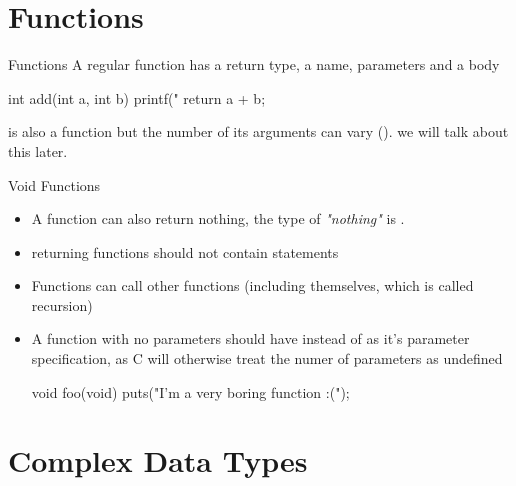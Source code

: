 \documentclass[10pt,graphics,aspectratio=169,table]{beamer}
\begin{document}
\section{Functions}
\begin{frame}[fragile]{Functions}
    A regular function has a return type, a name, parameters and a body
    \begin{codeblock}
int add(int a, int b){
    printf("%
    return a + b;
}
    \end{codeblock}

     is also a function but the number of its arguments 
    can vary (). we will talk about this later.
\end{frame}
\begin{frame}[fragile]{Void Functions}
    \begin{itemize}
       
        \item
            A function can also return nothing,
            the type of \textit{"nothing"} is .
        \item
             returning functions should not 
            contain  statements
        \item 
            Functions can call other functions 
            (including themselves, which is called recursion)
  
        \item 
            A function with no parameters should have  instead of 
            \code{()} as it's parameter specification,
            as C will otherwise treat the numer
            of parameters as undefined
            \begin{codeblock}
void foo(void){
    puts("I'm a very boring function :(");
}
            \end{codeblock}
    \end{itemize}

\end{frame}

\section{Complex Data Types}
\end{document}
